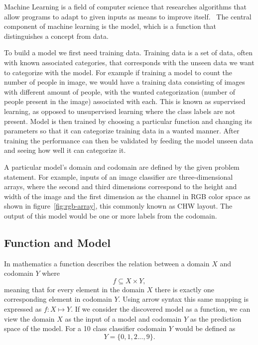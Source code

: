 \documentclass[12pt,a4paper,english
]{tunithesis}
\begin{document}
Machine Learning is a field of computer science that researches algorithms that allow programs to adapt to given inputs as means to improve itself.~\cite{mitchell1997machine}
The central component of machine learning is the model, which is a function that distinguishes a concept from data.

To build a model we first need training data. Training data is a set of data, often with known associated categories, that corresponds with the unseen data we want to categorize with the model. For example if training a model to count the number of people in image, we would have a training data consisting of images with different amount of people, with the wanted categorization (number of people present in the image) associated with each. This is known as supervised learning, as opposed to unsupervised learning where the class labels are not present. Model is then trained by choosing a particular function and changing its parameters so that it can categorize training data in a wanted manner. After training the performance can then be validated by feeding the model unseen data and seeing how well it can categorize it.

A particular model's domain and codomain are defined by the given problem statement. For example, inputs of an image classifier are three-dimensional arrays, where the second and third dimensions correspond to the height and width of the image and the first dimension as the channel in RGB color space as shown in figure~\ref{fig:rgb-array}, this commonly known as CHW layout.
The output of this model would be one or more labels from the codomain.


\subsection{Function and Model}
In mathematics a function describes the relation between a domain $X$ and codomain $Y$ where
\begin{equation}
  f \subseteq X \times Y,
\end{equation}
meaning that for every element in the domain $X$ there is exactly one corresponding element in codomain $Y$. Using arrow syntax this same mapping is expressed as $f : X \mapsto Y$. If we consider the discovered model as a function, we can view the domain $X$ as the input of a model and codomain $Y$ as the prediction space of the model. For a 10 class classifier codomain $Y$ would be defined as
\begin{equation}
  Y = \{0, 1, 2 ..., 9\}.
\end{equation}
\end{document}
